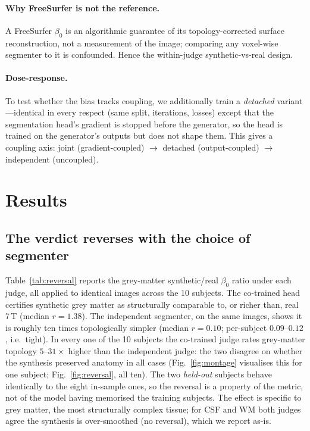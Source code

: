\documentclass[11pt,a4paper]{article}
\begin{document}
\paragraph{Why FreeSurfer is not the reference.} A FreeSurfer $\beta_0$ is an algorithmic guarantee
of its topology-corrected surface reconstruction, not a measurement of the image; comparing any
voxel-wise segmenter to it is confounded. Hence the within-judge synthetic-vs-real design.

\paragraph{Dose-response.} To test whether the bias tracks coupling, we additionally train a
\emph{detached} variant---identical in every respect (same split, iterations, losses) except that
the segmentation head's gradient is stopped before the generator, so the head is trained on the
generator's outputs but does not shape them. This gives a coupling axis:
joint (gradient-coupled) $\rightarrow$ detached (output-coupled) $\rightarrow$ independent
(uncoupled).

\section{Results}
\subsection{The verdict reverses with the choice of segmenter}\label{sec:reversal}
Table~\ref{tab:reversal} reports the grey-matter synthetic/real $\beta_0$ ratio under each judge,
all applied to identical images across the 10 subjects. The co-trained head certifies synthetic
grey matter as structurally comparable to, or richer than, real 7\,T (median $r=1.38$). The
independent segmenter, on the same images, shows it is roughly ten times topologically simpler
(median $r=0.10$; per-subject $0.09$--$0.12$, i.e.\ tight). In every one of the 10 subjects the
co-trained judge rates grey-matter topology $5$--$31\times$ higher than the independent judge:
the two disagree on whether the synthesis preserved anatomy in all cases
(Fig.~\ref{fig:montage} visualises this for one subject; Fig.~\ref{fig:reversal}, all ten). The two \emph{held-out}
subjects behave identically to the eight in-sample ones, so the reversal is a property of the
metric, not of the model having memorised the training subjects. The effect is specific to grey
matter, the most structurally complex tissue; for CSF and WM both judges agree the synthesis is
over-smoothed (no reversal), which we report as-is.
\end{document}
